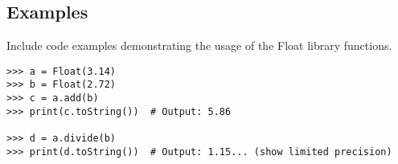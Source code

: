 \subsection{Examples}

Include code examples demonstrating the usage of the Float library functions. 

\begin{verbatim}
>>> a = Float(3.14)
>>> b = Float(2.72)
>>> c = a.add(b)
>>> print(c.toString())  # Output: 5.86

>>> d = a.divide(b)
>>> print(d.toString())  # Output: 1.15... (show limited precision)
\end{verbatim}

